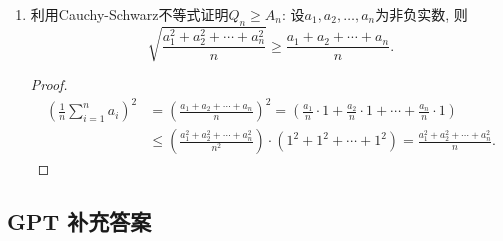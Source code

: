 \documentclass[UTF8,11pt, a4paper, oneside, fontset=none]{ctexbook}
\begin{document}
\begin{enumerate}
\begin{proof}
现在将$a_1, a_2, \ldots, a_{k+1}$根据重新排序并编号, 使得$a_{k+1}$是其中的最大数(之一). 进而再分解式(2). 这个分解中的$B$项一定是非负数, 从而满足条件$A>0, B \geq 0$. 从二项式展开定理就有$(A+B)^{k+1} \geq A^{k+1} + (k+1)A^kB$. 因此根据二项式定理, 
\begin{align*}
\left( \frac{a_1 + a_2 + \cdots + a_{k+1}}{k+1} \right)^{k+1} & = (A+B)^{k+1} \geq A^{k+1} + (k+1) A^k B\\
& = A^k [ A + (k+1)B]\\
& = \left( \frac{a_1 + a_2 + \cdots + a_{k}}{k} \right)^{k} \cdot a_{k+1} \\
& \geq a_1a_2 \cdots a_k a_{k+1}.
\end{align*}
不等式中等号成立的条件也可用数学归纳法得到, 不赘述.


\end{proof}


\item 利用Cauchy-Schwarz不等式证明$Q_n \geq A_n$: 设$a_1, a_2, \ldots, a_n$为非负实数, 则
\[ \sqrt{\frac{a_1^2 + a_2^2 + \cdots + a_n^2}{n}} \geq \frac{a_1 + a_2 + \cdots + a_n}{n}.
\]


\begin{proof}
\begin{align*}
\left( \frac{1}{n} \sum\limits_{i=1}^n a_i\right)^2 & = \left( \frac{a_1 + a_2 + \cdots + a_n}{n} \right)^2 = \left(\frac{a_1}{n} \cdot 1 + \frac{a_2}{n} \cdot 1 + \cdots +\frac{a_n}{n} \cdot 1 \right) \\
& \leq \left( \frac{a_1^2 + a_2^2 + \cdots + a_n^2}{n^2} \right) \cdot (1^2 + 1^2 + \cdots + 1^2) = \frac{a_1^2 + a_2^2 + \cdots + a_n^2}{n}.
\end{align*}
\end{proof}
\end{enumerate}

\clearpage

\subsection*{GPT 补充答案}
\end{document}
